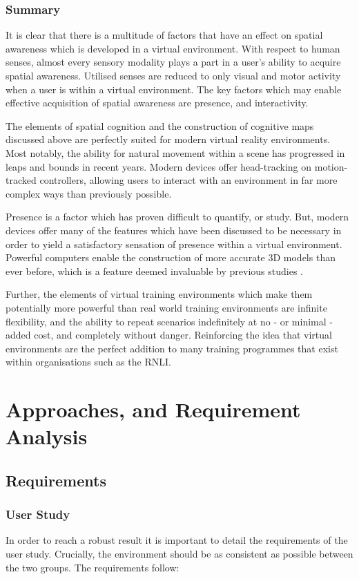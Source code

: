 \documentclass[ %
                    author={Elis Jones},
                supervisor={Dr. Kirsten Cater},
                    degree={BSc},
                     title={The Effect of Presentation Medium on Spatial Cognition},
                  subtitle={in the Virtual Environment},
                      year={2018} ]{dissertation}
\begin{document}
\subsection{Summary}\label{intro-summary}
It is clear that there is a multitude of factors that have an effect on spatial awareness which is developed in a virtual environment. With respect to human senses, almost every sensory modality plays a part in a user's ability to acquire spatial awareness. Utilised senses are reduced to only visual and motor activity when a user is within a virtual environment. The key factors which may enable effective acquisition of spatial awareness are presence, and interactivity. 

The elements of spatial cognition and the construction of cognitive maps discussed above are perfectly suited for modern virtual reality environments. Most notably, the ability for natural movement within a scene has progressed in leaps and bounds in recent years. Modern devices offer head-tracking on motion-tracked controllers, allowing users to interact with an environment in far more complex ways than previously possible.

Presence is a factor which has proven difficult to quantify, or study. But, modern devices offer many of the features which have been discussed to be necessary in order to yield a satisfactory sensation of presence within a virtual environment. Powerful computers enable the construction of more accurate 3D models than ever before, which is a feature deemed invaluable by previous studies \citep{steuer}. 

Further, the elements of virtual training environments which make them potentially more powerful than real world training environments are infinite flexibility, and the ability to repeat scenarios indefinitely at no - or minimal - added cost, and completely without danger. Reinforcing the idea that virtual environments are the perfect addition to many training programmes that exist within organisations such as the RNLI.


\chapter{Approaches, and Requirement Analysis}

\section{Requirements} \label{requirements}
\subsection{User Study}
In order to reach a robust result it is important to detail the requirements of the user study. Crucially, the environment should be as consistent as possible between the two groups. The requirements follow:
\end{document}

